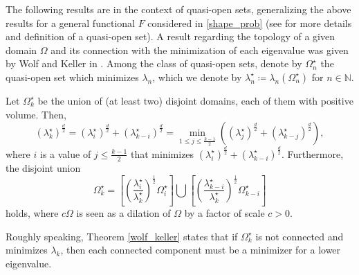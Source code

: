 The following results are in the context of quasi-open sets, generalizing the above results for a general functional \(F\) considered in \eqref{shape_prob} (see \cite{henrot2006extremum} for more details and definition of a quasi-open set). A result regarding the topology of a given domain \(\Omega\) and its connection with the minimization of each eigenvalue was given by Wolf and Keller in \cite{wolf1994range}. Among the class of quasi-open sets, denote by $\Omega_n^\star$ the quasi-open set which minimizes $\lambda_n$, which we denote by $\lambda_n^\star \coloneq \lambda_n(\Omega_n^\star)$ for $n \in \mathbb{N}$.
\begin{theorem}\label{wolf_keller}
    Let \(\Omega_k^\star\) be the union of (at least two) disjoint domains, each of them with positive volume. Then,
    \[
        (\lambda_k^\star)^\frac{d}{2} = (\lambda_i^\star)^\frac{d}{2} + (\lambda_{k-i}^\star)^\frac{d}{2} = \min_{1 \leq j \leq \frac{k-1}{2}}((\lambda_j^\star)^\frac{d}{2} + (\lambda_{k-j}^\star)^\frac{d}{2}),
    \]
    where \(i\) is a value of \(j \leq \frac{k-1}{2}\) that minimizes \(\left(\lambda_i^\star\right)^\frac{d}{2} + \left(\lambda_{k-i}^\star\right)^\frac{d}{2}\). Furthermore, the disjoint union
    \[
        \Omega_k^\star = \left[\left(\frac{\lambda_i^\star}{\lambda_k^\star}\right)^\frac{1}{2} \Omega_i^\star\right] \bigcup \left[\left(\frac{\lambda_{k-i}^\star}{\lambda_k^\star}\right)^\frac{1}{2} \Omega_{k-i}^\star \right]
    \]
    holds, where $c \Omega$ is seen as a dilation of $\Omega$ by a factor of scale $c > 0$.
\end{theorem}
Roughly speaking, Theorem \ref{wolf_keller} states that if \(\Omega_k^\star\) is not connected and minimizes \(\lambda_k\), then each connected component must be a minimizer for a lower eigenvalue.

